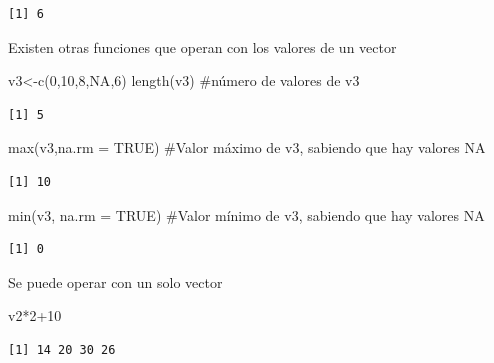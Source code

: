 \documentclass[
  letterpaper,
  DIV=11,
  numbers=noendperiod]{scrreprt}
\newenvironment{Shaded}{\begin{snugshade}}{\end{snugshade}}
\newcommand{\AttributeTok}[1]{\textcolor[rgb]{0.40,0.45,0.13}{#1}}
\newcommand{\CommentTok}[1]{\textcolor[rgb]{0.37,0.37,0.37}{#1}}
\newcommand{\ConstantTok}[1]{\textcolor[rgb]{0.56,0.35,0.01}{#1}}
\newcommand{\DecValTok}[1]{\textcolor[rgb]{0.68,0.00,0.00}{#1}}
\newcommand{\FunctionTok}[1]{\textcolor[rgb]{0.28,0.35,0.67}{#1}}
\newcommand{\NormalTok}[1]{\textcolor[rgb]{0.00,0.23,0.31}{#1}}
\newcommand{\OtherTok}[1]{\textcolor[rgb]{0.00,0.23,0.31}{#1}}
\newcommand{\SpecialCharTok}[1]{\textcolor[rgb]{0.37,0.37,0.37}{#1}}
\begin{document}
\begin{verbatim}
[1] 6
\end{verbatim}

Existen otras funciones que operan con los valores de un vector

\begin{Shaded}
\begin{Highlighting}[]
\NormalTok{v3}\OtherTok{\textless{}{-}}\FunctionTok{c}\NormalTok{(}\DecValTok{0}\NormalTok{,}\DecValTok{10}\NormalTok{,}\DecValTok{8}\NormalTok{,}\ConstantTok{NA}\NormalTok{,}\DecValTok{6}\NormalTok{)}
\FunctionTok{length}\NormalTok{(v3) }\CommentTok{\#número de valores de v3}
\end{Highlighting}
\end{Shaded}

\begin{verbatim}
[1] 5
\end{verbatim}

\begin{Shaded}
\begin{Highlighting}[]
\FunctionTok{max}\NormalTok{(v3,}\AttributeTok{na.rm =} \ConstantTok{TRUE}\NormalTok{) }\CommentTok{\#Valor máximo de v3, sabiendo que hay valores NA}
\end{Highlighting}
\end{Shaded}

\begin{verbatim}
[1] 10
\end{verbatim}

\begin{Shaded}
\begin{Highlighting}[]
\FunctionTok{min}\NormalTok{(v3, }\AttributeTok{na.rm =} \ConstantTok{TRUE}\NormalTok{) }\CommentTok{\#Valor mínimo de v3, sabiendo que hay valores NA}
\end{Highlighting}
\end{Shaded}

\begin{verbatim}
[1] 0
\end{verbatim}

Se puede operar con un solo vector

\begin{Shaded}
\begin{Highlighting}[]
\NormalTok{v2}\SpecialCharTok{*}\DecValTok{2}\SpecialCharTok{+}\DecValTok{10}
\end{Highlighting}
\end{Shaded}

\begin{verbatim}
[1] 14 20 30 26
\end{verbatim}
\end{document}
